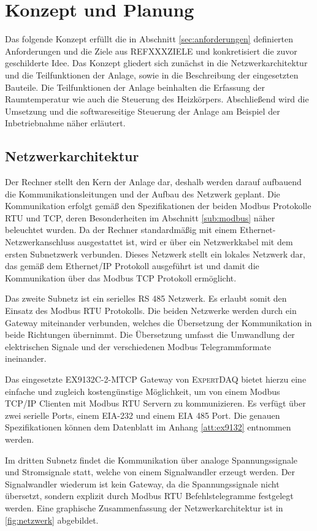 \section{Konzept und Planung}
 
Das folgende Konzept erfüllt die in Abschnitt  \ref{sec:anforderungen} definierten Anforderungen und die Ziele aus REFXXXZIELE	und konkretisiert die zuvor geschilderte Idee. Das Konzept gliedert sich zunächst in die Netzwerkarchitektur und die Teilfunktionen der Anlage, sowie in die Beschreibung der eingesetzten Bauteile. Die Teilfunktionen der Anlage beinhalten die Erfassung der Raumtemperatur wie auch die Steuerung des Heizkörpers. Abschließend wird die Umsetzung und die softwareseitige Steuerung der Anlage am Beispiel der Inbetriebnahme näher erläutert.

\subsection{Netzwerkarchitektur}

Der Rechner stellt den Kern der Anlage dar, deshalb werden darauf aufbauend die Kommunikationsleitungen und der Aufbau des Netzwerk geplant. Die Kommunikation erfolgt gemäß den Spezifikationen der beiden Modbus Protokolle RTU und TCP, deren Besonderheiten im Abschnitt \ref{sub:modbus} näher beleuchtet wurden. Da der Rechner standardmäßig mit einem Ethernet-Netzwerkanschluss ausgestattet ist, wird er über ein Netzwerkkabel mit dem ersten Subnetzwerk verbunden. Dieses Netzwerk stellt ein lokales Netzwerk dar, das gemäß dem Ethernet/IP Protokoll ausgeführt ist und damit die Kommunikation über das Modbus TCP Protokoll ermöglicht.

Das zweite Subnetz ist ein serielles RS 485 Netzwerk. Es erlaubt somit den Einsatz des Modbus RTU Protokolls. Die beiden Netzwerke werden durch ein Gateway miteinander verbunden, welches die Übersetzung der Kommunikation in beide Richtungen übernimmt. Die Übersetzung umfasst die Umwandlung der elektrischen Signale und der verschiedenen Modbus Telegrammformate ineinander.

Das eingesetzte \textsc{EX9132C-2-MTCP} Gateway von \textsc{ExpertDAQ} bietet hierzu eine einfache und zugleich kostengünstige Möglichkeit, um von einem Modbus TCP/IP Clienten mit Modbus RTU Servern zu kommunizieren. Es verfügt über zwei serielle Ports, einem EIA-232 und einem EIA 485 Port. Die genauen Spezifikationen können dem Datenblatt im Anhang \ref{att:ex9132} entnommen werden.

Im dritten Subnetz findet die Kommunikation über analoge Spannungssignale und Stromsignale statt, welche von einem Signalwandler erzeugt werden. Der Signalwandler wiederum ist kein Gateway, da die Spannungssignale nicht übersetzt, sondern explizit durch Modbus RTU Befehlstelegramme festgelegt werden. Eine graphische Zusammenfassung der Netzwerkarchitektur ist in \ref{fig:netzwerk} abgebildet.


